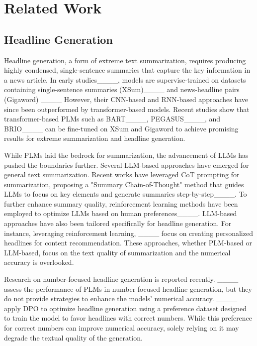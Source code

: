 \section{Related Work}
\subsection{Headline Generation}

Headline generation, a form of extreme text summarization, requires producing highly condensed, single-sentence summaries that capture the key information in a news article. 
In early studies____, models are supervise-trained on datasets containing single-sentence summaries (XSum)____ and news-headline pairs (Gigaword) ____ However, their CNN-based and RNN-based approaches have since been outperformed by transformer-based models. 
Recent studies show that transformer-based PLMs such as BART____, PEGASUS____, and BRIO____ can be fine-tuned on XSum and Gigaword to achieve promising results for extreme summarization and headline generation. 

While PLMs laid the bedrock for summarization, the advancement of LLMs has pushed the boundaries further. Several LLM-based approaches have emerged for general text summarization. Recent works have leveraged CoT prompting for summarization, proposing a "Summary Chain-of-Thought" method that guides LLMs to focus on key elements and generate summaries step-by-step____. To further enhance summary quality, reinforcement learning methods have been employed to optimize LLMs based on human preferences____. LLM-based approaches have also been tailored specifically for headline generation. For instance, leveraging reinforcement learning, ____ focus on creating personalized headlines for content recommendation. 
These approaches, whether PLM-based or LLM-based, focus on the text quality of summarization and the numerical accuracy is overlooked.

Research on number-focused headline generation is reported recently. 
____ assess the performance of PLMs in number-focused headline generation, but they do not provide strategies to enhance the models' numerical accuracy. ____ apply DPO to optimize headline generation using a preference dataset designed to train the model to favor headlines with correct numbers. While this preference for correct numbers can improve numerical accuracy, solely relying on it may degrade the textual quality of the generation. 

